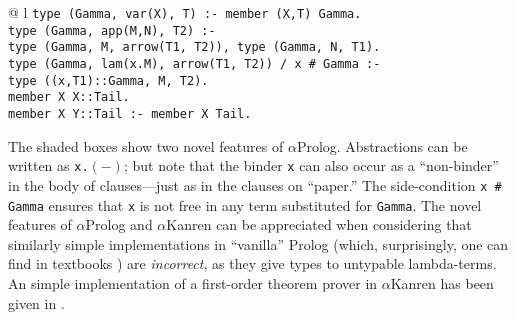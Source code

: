 \begin{isabellebody}
\begin{isamarkuptext}
  
  \begin{center}
  \begin{tabular}{@ {}l}
  {\hspace{4.3mm}\tt type (Gamma, var(X), T) :- member (X,T) Gamma.}\\[2mm]
  {\hspace{4.3mm}\tt type (Gamma, app(M,N), T2) :-}\\[0.0mm]
  {\hspace{1.2cm}\tt       type (Gamma, M, arrow(T1, T2)), type (Gamma, N, T1).}\\[2mm]
  {\hspace{4.3mm}\tt type (Gamma, \colorbox{mygrey}{lam(x.M)}, arrow(T1, T2)) /
  \colorbox{mygrey}{x \# Gamma} :-}\\
  {\hspace{1.2cm}\tt type ((x,T1)::Gamma, M, T2).}\\[4mm]
  {\hspace{4.3mm}\tt member X X::Tail.}\\
  {\hspace{4.3mm}\tt member X Y::Tail :- member X Tail.}\\
  \end{tabular}
  \end{center}

  \noindent
  The shaded boxes show two novel features of $\alpha$Prolog.  Abstractions can
  be written as {\tt x.$(-)$}; but note that the binder {\tt x} can also occur
  as a ``non-binder'' in the body of clauses---just as in the clauses on
  ``paper.''  The side-condition {\tt x\,\#\,Gamma} ensures that {\tt x} is not
  free in any term substituted for {\tt Gamma}. The novel features of
  $\alpha$Prolog and $\alpha$Kanren can be appreciated when considering that similarly simple
  implementations in ``vanilla'' Prolog (which, surprisingly, one can find in textbooks 
  \cite{Mitchell03}) are
  \emph{incorrect}, as they give types to untypable lambda-terms. An 
  simple implementation of a first-order theorem prover in $\alpha$Kanren
  has been given in \cite{alphaleantap08}.



\end{isamarkuptext}
\end{isabellebody}
